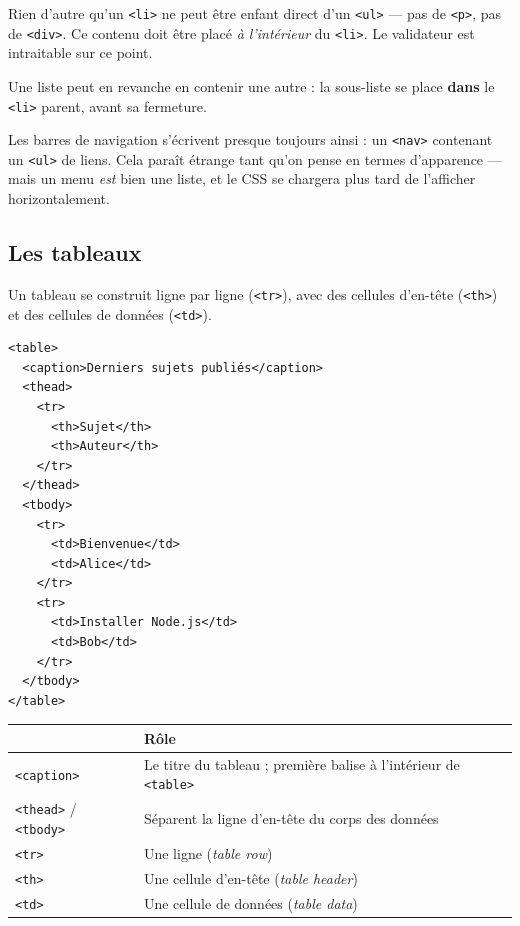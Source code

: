 \documentclass[a4paper,11pt]{article}
\newcommand{\hdr}[1]{\multicolumn{1}{l}{\color{white}\bfseries #1}}
\renewcommand{\arraystretch}{1.3}
\begin{document}
\begin{tcolorbox}[attention, title={Un \texttt{<li>} vit toujours dans un \texttt{<ul>} ou un \texttt{<ol>}}]
Rien d'autre qu'un \texttt{<li>} ne peut être enfant direct d'un \texttt{<ul>} --- pas de \texttt{<p>}, pas de \texttt{<div>}. Ce contenu doit être placé \textit{à l'intérieur} du \texttt{<li>}. Le validateur est intraitable sur ce point.

\vspace{3pt}
Une liste peut en revanche en contenir une autre : la sous-liste se place \textbf{dans} le \texttt{<li>} parent, avant sa fermeture.
\end{tcolorbox}

\begin{tcolorbox}[astuce, title={Un menu de navigation est une liste de liens}]
Les barres de navigation s'écrivent presque toujours ainsi : un \texttt{<nav>} contenant un \texttt{<ul>} de liens. Cela paraît étrange tant qu'on pense en termes d'apparence --- mais un menu \textit{est} bien une liste, et le CSS se chargera plus tard de l'afficher horizontalement.
\end{tcolorbox}

\subsection{Les tableaux}

Un tableau se construit ligne par ligne (\texttt{<tr>}), avec des cellules d'en-tête (\texttt{<th>}) et des cellules de données (\texttt{<td>}).

\begin{lstlisting}[language=HTML5, caption={Un tableau complet}]
<table>
  <caption>Derniers sujets publiés</caption>
  <thead>
    <tr>
      <th>Sujet</th>
      <th>Auteur</th>
    </tr>
  </thead>
  <tbody>
    <tr>
      <td>Bienvenue</td>
      <td>Alice</td>
    </tr>
    <tr>
      <td>Installer Node.js</td>
      <td>Bob</td>
    </tr>
  </tbody>
</table>
\end{lstlisting}

\begin{center}
\renewcommand{\arraystretch}{1.0}
\begin{tabularx}{\linewidth}{p{2.4cm}X}
  \toprule
  \rowcolor{uniNavy}
  \hdr{Balise} & \hdr{Rôle} \\
  \midrule
  \rowcolor{uniPaper}
  \texttt{<caption>} & Le titre du tableau ; première balise à l'intérieur de \texttt{<table>} \\
  \texttt{<thead>} / \texttt{<tbody>} & Séparent la ligne d'en-tête du corps des données \\
  \rowcolor{uniPaper}
  \texttt{<tr>} & Une ligne (\textit{table row}) \\
  \texttt{<th>} & Une cellule d'en-tête (\textit{table header}) \\
  \rowcolor{uniPaper}
  \texttt{<td>} & Une cellule de données (\textit{table data}) \\
  \bottomrule
\end{tabularx}
\end{center}
\end{document}
